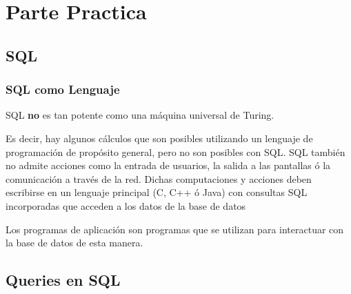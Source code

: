 \documentclass[12pt, fleqn]{report}                             %
\begin{document}
\part{Parte Practica}
\clearpage

    
    \chapter{SQL}

        \clearpage
        \section{SQL como Lenguaje}
            
            SQL \textbf{no} es tan potente como una máquina universal de Turing.

            Es decir, hay algunos cálculos que son posibles utilizando un lenguaje de programación
            de propósito general, pero no son posibles con SQL.
            SQL también no admite acciones como la entrada de usuarios, la salida a las pantallas 
            ó la comunicación a través de la red.
            Dichas computaciones y acciones deben escribirse en un lenguaje principal (C, C++ ó Java)
            con consultas SQL incorporadas que acceden a los datos de la base de datos

            Los programas de aplicación son programas que se utilizan para interactuar con la base de datos de esta manera.



    \chapter{Queries en SQL}
    \clearpage

\end{document}

